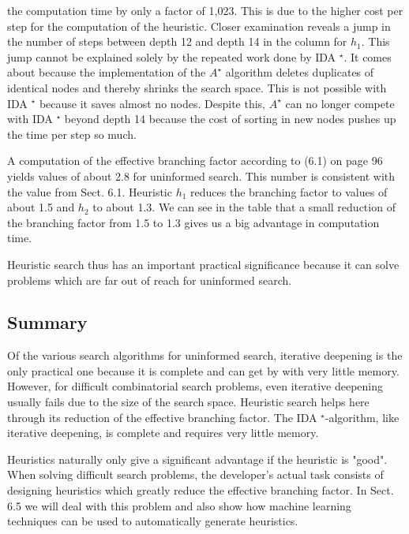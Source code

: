 \documentclass[10pt]{book}
\begin{document}
the computation time by only a factor of 1,023. This is due to the higher cost per step for the computation of the heuristic.
Closer examination reveals a jump in the number of steps between depth 12 and depth 14 in the column for $h_{1}$. This jump cannot be explained solely by the repeated work done by IDA ${ }^{\star}$. It comes about because the implementation of the $A^{\star}$ algorithm deletes duplicates of identical nodes and thereby shrinks the search space. This is not possible with IDA ${ }^{\star}$ because it saves almost no nodes. Despite this, $A^{\star}$ can no longer compete with IDA ${ }^{\star}$ beyond depth 14 because the cost of sorting in new nodes pushes up the time per step so much.

A computation of the effective branching factor according to (6.1) on page 96 yields values of about 2.8 for uninformed search. This number is consistent with the value from Sect. 6.1. Heuristic $h_{1}$ reduces the branching factor to values of about 1.5 and $h_{2}$ to about 1.3. We can see in the table that a small reduction of the branching factor from 1.5 to 1.3 gives us a big advantage in computation time.

Heuristic search thus has an important practical significance because it can solve problems which are far out of reach for uninformed search.

\subsection{Summary}
Of the various search algorithms for uninformed search, iterative deepening is the only practical one because it is complete and can get by with very little memory. However, for difficult combinatorial search problems, even iterative deepening usually fails due to the size of the search space. Heuristic search helps here through its reduction of the effective branching factor. The IDA ${ }^{\star}$-algorithm, like iterative deepening, is complete and requires very little memory.

Heuristics naturally only give a significant advantage if the heuristic is "good". When solving difficult search problems, the developer's actual task consists of designing heuristics which greatly reduce the effective branching factor. In Sect. 6.5 we will deal with this problem and also show how machine learning techniques can be used to automatically generate heuristics.
\end{document}
